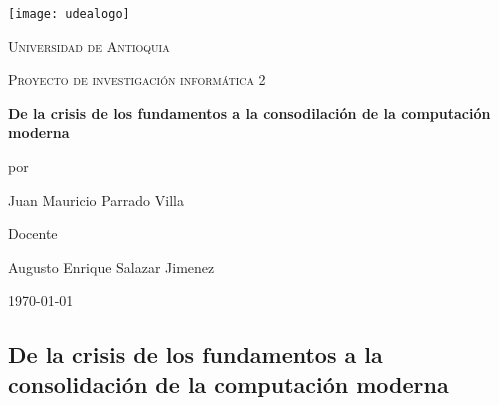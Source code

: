 \documentclass[12pt,a4paper]{report}
\begin{document}
   

    \begin{titlepage}

               \centering


               \texttt{[image: udealogo]}\par\vspace{1cm}

               {\scshape\LARGE Universidad de Antioquia \par}

               \vspace{1cm}

               {\scshape\large Proyecto de investigación informática 2\par}

               \vspace{1.5cm}

               {\Large\bfseries De la crisis de los fundamentos a la consodilación de la computación moderna\par}

               \vspace{2cm}

               por\par

               {\Large Juan Mauricio Parrado Villa\par}


               \vspace{2cm}

               Docente\par

               {\Large Augusto Enrique Salazar Jimenez}


               \vfill


               {\large \today\par}

    \end{titlepage}

    \large

    \begin{center}

        \section*{De la crisis de los fundamentos a la consolidación de la computación moderna}

    \end{center}
        
\end{document}
